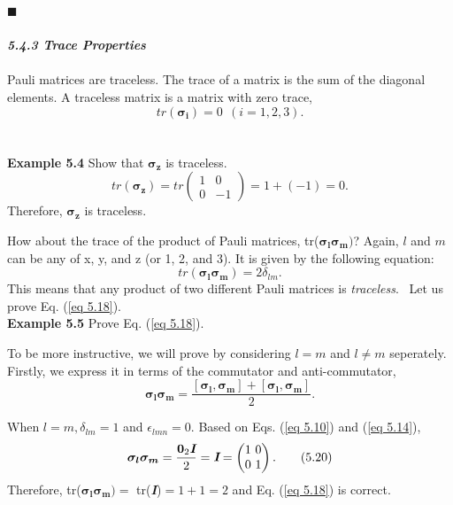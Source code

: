 \documentclass{article}
\newcommand{\bfit}[1]{\textit{\textbf{#1}}}
\begin{document}
\hfill $\blacksquare$
\\\\
\bfit{\large 5.4.3 Trace Properties}\\\\
Pauli matrices are traceless. The trace of a matrix is the sum of the diagonal
elements. A traceless matrix is a matrix with zero trace,
\begin{equation}\label{eq 5.16}
    tr(\boldsymbol{\sigma_i})=0 \ \ (i=1,2,3).\tag{5.16}
\end{equation}
\\\\
\textbf{Example 5.4} Show that $\boldsymbol{\sigma_z}$ is traceless.
\begin{equation}\label{eq 5.17}
    tr(\boldsymbol{\sigma_z})=tr\begin{pmatrix}
        1& 0\\ 0& -1
    \end{pmatrix}= 1 + (-1)=0.\tag{5.17}
\end{equation}
Therefore, $\boldsymbol{\sigma_z}$ is traceless.

How about the trace of the product of Pauli matrices, tr($\boldsymbol{\sigma_l\sigma_m})$?
Again, $l$ and $m$ can be any of  x, y, and z (or 1, 2, and 3). It is given by the following equation:
\begin{equation}\label{eq 5.18}
    tr(\boldsymbol{\sigma_l\sigma_m})=2\delta_{lm}. \tag{5.18}
\end{equation}
This means that any product of two different Pauli matrices is \textit{traceless}. \
Let us prove Eq. (\ref{eq 5.18}).
\\
\textbf{Example 5.5} Prove Eq. (\ref{eq 5.18}).

To be more instructive, we will prove by considering $l=m$ and $l\neq m$ seperately.
Firstly, we express it in terms of the commutator and anti-commutator,
\begin{equation} \label{eq 5.19}
    \boldsymbol{\sigma_l\sigma_m}=\frac{[\boldsymbol{\sigma_l},\boldsymbol{\sigma_m}]+[\boldsymbol{\sigma_l},\boldsymbol{\sigma_m}]}{2}.\tag{5.19}
\end{equation}

When $l=m, \delta_{lm}=1$ and $\epsilon_{lmn}=0$. Based on Eqs. (\ref{eq 5.10}) and (\ref{eq 5.14}),
\begin{equation}\label{eq 5.20}
    \boldsymbol{\sigma_l\sigma_m}=\frac{\textbf{0}_2\bfit{I}}{2}=\bfit{I}=\begin{pmatrix}
        1\ 0\\ 0\ 1
    \end{pmatrix}. \tag{5.20}
\end{equation}
Therefore, tr($\boldsymbol{\sigma_l\sigma_m})=$ tr(\bfit{I})$=1+1=2$ and
Eq. (\ref{eq 5.18}) is correct.
\end{document}
